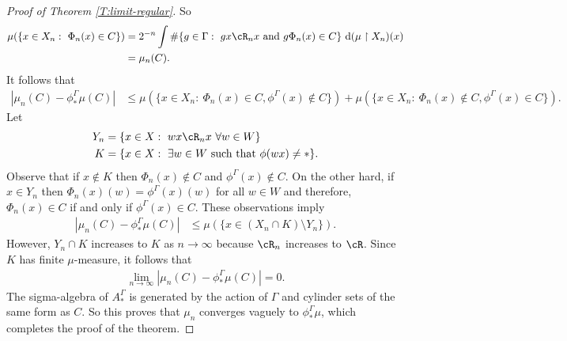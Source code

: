\documentclass[12pt]{article}
\theoremstyle{plain}
\newtheorem{prop}[thm]{Proposition}
\theoremstyle{definition}
\theoremstyle{remark}
\newcommand{\G}{\Gamma}
\def\cc{{\curvearrowright}}
\newcommand{\resto}{\upharpoonright}
\newcommand{\dee}{\textrm{d}}
\begin{document}
\begin{proof}[Proof of Theorem \ref{T:limit-regular}]
So
\begin{align*}
 \mu(\{x\in X_n:~ \Phi_n(x)\in C\}) &=   2^{-n}\int \#\{g\in\G:~ gx\cR_n x \textrm{ and } g\Phi_n(x) \in C\}~\dee(\mu\resto X_n)(x)\\
 &= \mu_n(C).
\end{align*}
It follows that
\begin{align*}
    |\mu_n(C)  - \phi^\G_*\mu(C)|  &\le \mu(\{x\in X_n:~ \Phi_n(x)\in C, \phi^\G(x)\notin C\}) + \mu(\{x\in X_n:~ \Phi_n(x)\notin C, \phi^\G(x)\in C\}).
\end{align*}
Let
\begin{align*}
   Y_n&=\{x\in X:~wx \cR_n x ~\forall w \in W\} \\
   K&=\{x\in X:~\exists w\in W \textrm{ such that }\phi(wx)\ne *\}.
\end{align*}
Observe that if $x\notin K$ then $\Phi_n(x)\notin C$ and $\phi^\G(x)\notin C$. On the other hard, if $x\in Y_n$ then $\Phi_n(x)(w)=\phi^\G(x)(w)$ for all $w\in W$ and therefore, $\Phi_n(x)\in C$ if and only if $\phi^\G(x)\in C$. These observations imply
\begin{align*}
    |\mu_n(C)  - \phi^\G_*\mu(C)|  &\le \mu(\{x\in (X_n \cap K) \setminus Y_n\}).
\end{align*}
However, $Y_n \cap K$ increases to $K$ as $n\to\infty$ because $\cR_n$ increases to $\cR$. Since $K$ has finite $\mu$-measure, it follows that
\begin{align*}
 \lim_{n\to\infty}   |\mu_n(C)  - \phi^\G_*\mu(C)| =0.
\end{align*}
The sigma-algebra of $A_*^\G$ is generated by the action of $\G$ and cylinder sets of the same form as $C$. So this proves that $\mu_n$ converges vaguely to $\phi^\G_*\mu$, which completes the proof of the theorem.
\end{proof}



    
\end{document}
